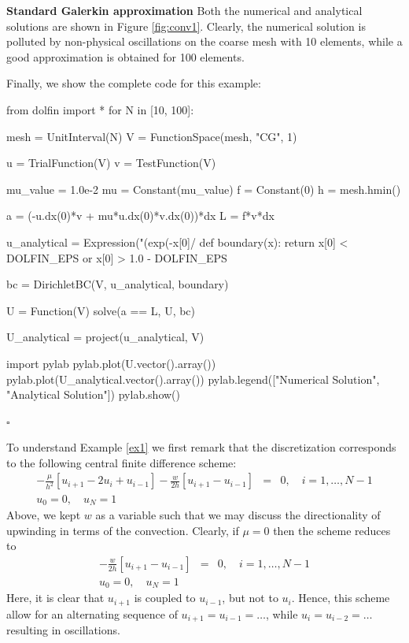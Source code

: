 \begin{example}{\textbf{Standard Galerkin approximation}}
Both the numerical and analytical solutions are shown in Figure \ref{fig:conv1}. Clearly, 
the numerical solution is polluted by non-physical oscillations on the coarse
mesh with 10 elements, while a good approximation is obtained for 100 elements.     


Finally, we show the complete code for this example: 
\begin{python}
from dolfin import *
for N in [10, 100]:

  mesh = UnitInterval(N)
  V = FunctionSpace(mesh, "CG", 1)

  u = TrialFunction(V)
  v = TestFunction(V)

  mu_value = 1.0e-2 
  mu = Constant(mu_value)
  f = Constant(0)
  h = mesh.hmin()

  a = (-u.dx(0)*v + mu*u.dx(0)*v.dx(0))*dx  
  L = f*v*dx  

  u_analytical = Expression("(exp(-x[0]/%
  def boundary(x):
      return x[0] < DOLFIN_EPS or x[0] > 1.0 - DOLFIN_EPS

  bc = DirichletBC(V, u_analytical, boundary) 

  U = Function(V)
  solve(a == L, U, bc) 

  U_analytical = project(u_analytical, V)

  import pylab 
  pylab.plot(U.vector().array())
  pylab.plot(U_analytical.vector().array())
  pylab.legend(["Numerical Solution", "Analytical Solution"])
  pylab.show()
\end{python}
$\square$ 
\end{example}

To understand Example \ref{ex1} we first remark that the discretization corresponds to the following 
central finite difference scheme: 
\begin{eqnarray*}
-\frac{\mu}{h^2}\left[u_{i+1}-2u_i+u_{i-1}\right] - 
\frac{w}{2h}\left[u_{i+1}-u_{i-1}\right] &=& 0, \quad i=1,\ldots,N-1\\
u_0=0,\quad u_N=1 &&
\end{eqnarray*}
Above, we kept $w$ as a variable such that we may discuss the directionality of upwinding in terms of the convection. 
Clearly, if $\mu=0$ then the scheme reduces to  
\begin{eqnarray*}
-\frac{w}{2h}\left[u_{i+1}-u_{i-1}\right] &=& 0, \quad i=1,\ldots,N-1\\
u_0=0,\quad u_N=1 &&
\end{eqnarray*}
Here, it is clear that $u_{i+1}$ is coupled to $u_{i-1}$, but not to 
$u_{i}$. 
Hence, this scheme allow for an alternating
sequence of $u_{i+1}=u_{i-1}=\ldots$, while $u_{i}=u_{i-2}=\ldots$
resulting in oscillations. 

